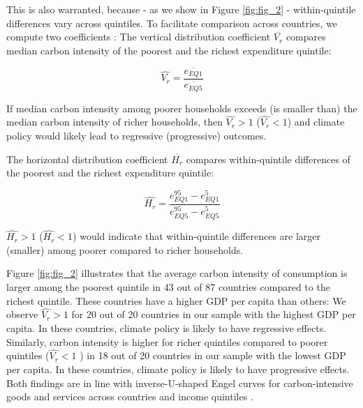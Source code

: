 \documentclass[12pt, a4paper]{article}
\begin{document}
This is also warranted, because - as we show in Figure \ref{fig:fig_2} - within-quintile differences vary across quintiles. To facilitate comparison across countries, we compute two coefficients \autocite{Missbach.2024}: The vertical distribution coefficient $\overline{V_{r}}$ compares median carbon intensity of the poorest and the richest expenditure quintile:

\begin{equation}
    \widehat{V_{r}} = \frac{\overline{e_{EQ1}}}{\overline{e_{EQ5}}}
\end{equation}

If median carbon intensity among poorer households exceeds (is smaller than) the median carbon intensity of richer households, then $\widehat{V_{r}}>1$ ($\widehat{V_{r}}<1$) and climate policy would likely lead to regressive (progressive) outcomes.

The horizontal distribution coefficient $\overline{H_{r}}$ compares within-quintile differences of the poorest and the richest expenditure quintile:

\begin{equation}
    \widehat{H_{r}} = \frac{e_{EQ1}^{95} - e_{EQ1}^{5}}{e_{EQ5}^{95} - e_{EQ5}^{5}}
\end{equation}

$\widehat{H_{r}}>1$ ($\widehat{H_{r}}<1$) would indicate that within-quintile differences are larger (smaller) among poorer compared to richer households.

Figure \ref{fig:fig_2} illustrates that the average carbon intensity of consumption is larger among the poorest quintile in 43 out of 87 countries compared to the richest quintile. These countries have a higher GDP per capita than others: We observe $\widehat{V_{r}}>1$ for 20 out of 20 countries in our sample with the highest GDP per capita. In these countries, climate policy is likely to have regressive effects. Similarly, carbon intensity is higher for richer quintiles compared to poorer quintiles ($\widehat{V_{r}}<1$ ) in 18 out of 20 countries in our sample with the lowest GDP per capita. In these countries, climate policy is likely to have progressive effects. Both findings are in line with inverse-U-shaped Engel curves for carbon-intensive goods and services across countries and income quintiles \autocite{Dorband.2019}. 

\end{document}
